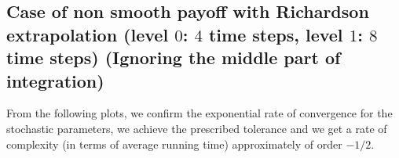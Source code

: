 \documentclass[11pt]{article}
\begin{document}
%
%
%
%
%
%
\newpage

\subsection{Case of non smooth payoff  with Richardson extrapolation (level $0$: $4$ time steps, level $1$: $8$ time steps) (Ignoring the middle part of integration)}

From the following plots, we confirm the exponential rate of convergence for the stochastic parameters, we achieve the prescribed tolerance and  we get a rate of complexity (in terms of average running time) approximately of order $-1/2$.
\end{document}
